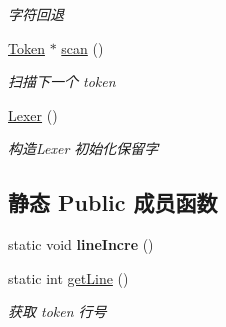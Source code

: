 \begin{DoxyCompactItemize}
\begin{DoxyCompactList}\small\item\em 字符回退 \end{DoxyCompactList}\item 
\hyperlink{class_token}{Token} $\ast$ \hyperlink{class_lexer_a2085b8262f6237de60583375ee2731f4}{scan} ()
\begin{DoxyCompactList}\small\item\em 扫描下一个 token \end{DoxyCompactList}\item 
\hyperlink{class_lexer_a2752a2b16cc1ffbcb8fc3e82e95bf331}{Lexer} ()\hypertarget{class_lexer_a2752a2b16cc1ffbcb8fc3e82e95bf331}{}\label{class_lexer_a2752a2b16cc1ffbcb8fc3e82e95bf331}

\begin{DoxyCompactList}\small\item\em 构造\+Lexer 初始化保留字 \end{DoxyCompactList}\end{DoxyCompactItemize}
\subsection*{静态 Public 成员函数}
\begin{DoxyCompactItemize}
\item 
static void {\bfseries line\+Incre} ()\hypertarget{class_lexer_a48478c1d6556ce949e7808bf3e2604b7}{}\label{class_lexer_a48478c1d6556ce949e7808bf3e2604b7}

\item 
static int \hyperlink{class_lexer_a0ede40225695d9eb9b42d275584cf8f0}{get\+Line} ()\hypertarget{class_lexer_a0ede40225695d9eb9b42d275584cf8f0}{}\label{class_lexer_a0ede40225695d9eb9b42d275584cf8f0}

\begin{DoxyCompactList}\small\item\em 获取 token 行号 \end{DoxyCompactList}\end{DoxyCompactItemize}
